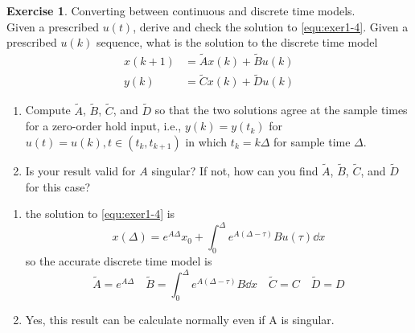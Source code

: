 \documentclass[11pt,a4paper]{report}
\theoremstyle{definition}\newtheorem{exercise}{Exercise}[chapter]
\begin{document}
\begin{exercise} Converting between continuous and discrete time models.\\
Given a prescribed $u(t)$, derive and check the solution to \eqref{equ:exer1-4}. Given a prescribed $u(k)$ sequence, what is the solution to the discrete time model
\begin{align}
    x(k+1)&=\tilde Ax(k)+\tilde Bu(k)\\
    y(k)&=\tilde Cx(k)+\tilde Du(k)
\end{align}
\begin{enumerate}[label=(\alph*)]
    \item Compute $\tilde A$, $\tilde B$, $\tilde C$, and $\tilde D$ so that the two solutions agree at the sample times for a zero-order hold input, i.e., $y(k)=y(t_k)$ for $u(t)=u(k), t\in (t_k,t_{k+1})$ in which $t_k=k\Delta$ for sample time $\Delta$.
    \item Is your result valid for $A$ singular? If not, how can you find $\tilde A$, $\tilde B$, $\tilde C$, and $\tilde D$ for this case?
\end{enumerate}
\end{exercise}

\begin{answer}
\begin{enumerate}[label=(\alph*)]
    \item the solution to \eqref{equ:exer1-4} is
    \begin{equation}
        x(\Delta)=e^{A\Delta}x_0+\int_0^\Delta e^{A(\Delta-\tau)}Bu(\tau)\dd x
    \end{equation}
    so the accurate discrete time model is
    \begin{equation}
        \tilde{A}=e^{A\Delta}\quad\tilde B=\int_0^\Delta e^{A(\Delta-\tau)}B\dd x
        \quad\tilde{C}=C\quad\tilde{D}=D
    \end{equation}
    \item Yes, this result can be calculate normally even if A is singular.
\end{enumerate}
\end{answer}
\end{document}
